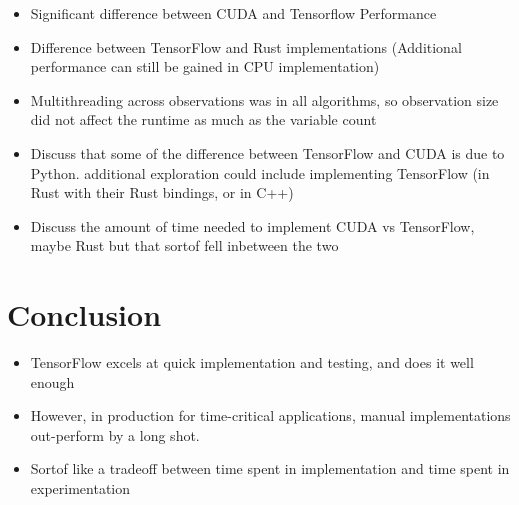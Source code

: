 \documentclass[12pt]{article}
\begin{document}
\begin{itemize}
	\item Significant difference between CUDA and Tensorflow Performance
	\item Difference between TensorFlow and Rust implementations (Additional performance can still be gained in CPU implementation)
	\item Multithreading across observations was in all algorithms, so observation size did  not affect the runtime as much as the variable count
	\item Discuss that some of the difference between TensorFlow and CUDA is due to Python. additional exploration could include implementing TensorFlow (in Rust with their Rust bindings, or in C++)
	\item Discuss the amount of time needed to implement CUDA vs TensorFlow, maybe Rust but that sortof fell inbetween the two
\end{itemize}

\section{Conclusion}

\begin{itemize}
	\item TensorFlow excels at quick implementation and testing, and does it well enough
	\item However, in production for time-critical applications, manual implementations out-perform by a long shot.
	\item Sortof like a tradeoff between time spent in implementation and time spent in experimentation
\end{itemize}


\newpage


\end{document}

